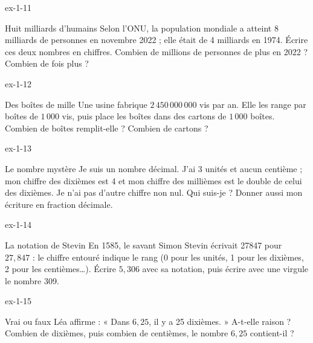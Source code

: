 \begin{blocLivre}{ex-1-11}\begin{exercice}[3]{Huit milliards d’humains}
Selon l’ONU, la population mondiale a atteint 8 milliards de personnes en novembre 2022 ; elle était de 4 milliards en 1974. Écrire ces deux nombres en chiffres. Combien de millions de personnes de plus en 2022 ? Combien de fois plus ?
\end{exercice}\end{blocLivre}
\begin{blocLivre}{ex-1-12}\begin{exercice}[3]{Des boîtes de mille}
Une usine fabrique $2\,450\,000\,000$ vis par an. Elle les range par boîtes de $1\,000$ vis, puis place les boîtes dans des cartons de $1\,000$ boîtes. Combien de boîtes remplit-elle ? Combien de cartons ?
\end{exercice}\end{blocLivre}
\begin{blocLivre}{ex-1-13}\begin{exercice}[3]{Le nombre mystère}
Je suis un nombre décimal. J’ai 3 unités et aucun centième ; mon chiffre des dixièmes est 4 et mon chiffre des millièmes est le double de celui des dixièmes. Je n’ai pas d’autre chiffre non nul. Qui suis-je ? Donner aussi mon écriture en fraction décimale.
\end{exercice}\end{blocLivre}
\begin{blocLivre}{ex-1-14}\begin{exercice}[3]{La notation de Stevin}
En 1585, le savant Simon Stevin écrivait 27847 pour $27{,}847$ : le chiffre entouré indique le rang (0 pour les unités, 1 pour les dixièmes, 2 pour les centièmes…). Écrire $5{,}306$ avec sa notation, puis écrire avec une virgule le nombre 309.
\end{exercice}\end{blocLivre}
\begin{blocLivre}{ex-1-15}\begin{exercice}[3]{Vrai ou faux}
Léa affirme : « Dans $6{,}25$, il y a 25 dixièmes. » A-t-elle raison ? Combien de dixièmes, puis combien de centièmes, le nombre $6{,}25$ contient-il ?
\end{exercice}\end{blocLivre}

\clearpage
